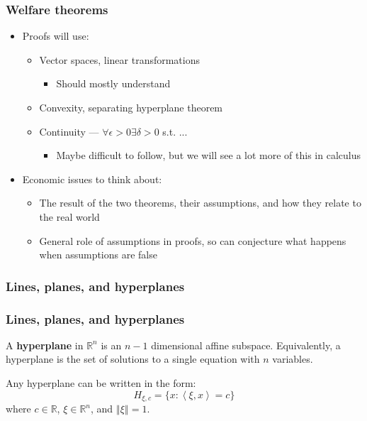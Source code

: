 \documentclass[compress]{beamer}
\def\R{\mathbb{R}}
\newcommand{\iprod}[2]{\left\langle {#1} , {#2} \right\rangle}
\newcommand{\norm}[1]{\left\Vert {#1} \right\Vert}
\begin{document}
\begin{frame}
  \frametitle{Welfare theorems}
  \begin{itemize}
  \item Proofs will use:
    \begin{itemize}
    \item Vector spaces, linear transformations
      \begin{itemize}
      \item Should mostly understand
      \end{itemize}
    \item Convexity, separating hyperplane theorem
    \item Continuity --- $\forall \epsilon > 0 \exists \delta > 0$
      s.t. ...
      \begin{itemize}
      \item Maybe difficult to follow, but we will see a lot more of
        this in calculus
      \end{itemize}
    \end{itemize}
  \item Economic issues to think about:
    \begin{itemize}
    \item The result of the two theorems, their assumptions, and how
      they relate to the real world
    \item General role of assumptions in proofs, so can conjecture
      what happens when assumptions are false 
    \end{itemize}
  \end{itemize}
\end{frame}

\subsubsection{Lines, planes, and hyperplanes }

\begin{frame}
  \frametitle{Lines, planes, and hyperplanes}
  \begin{definition}
    A \textbf{hyperplane} in $\R^n$ is an $n-1$ dimensional affine
    subspace. Equivalently, a hyperplane is the set of solutions to a
    single equation with $n$ variables.
  \end{definition}
  Any hyperplane can be written in the form:
  \[ H_{\xi,c} = \{x: \iprod{\xi}{x} = c \} \] where $c \in \R$, $\xi \in
  \R^n$, and $\norm{\xi} = 1$.
\end{frame}
\end{document}
